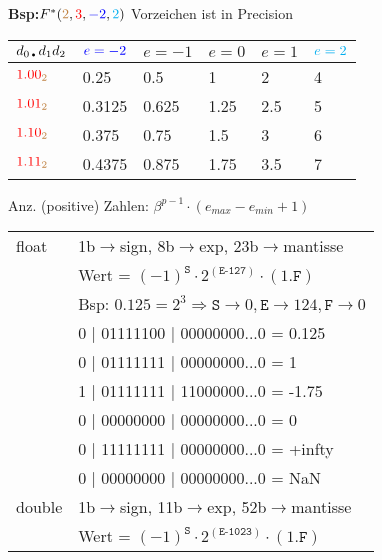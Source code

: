 \textbf{Bsp:$F^{\ast}({\color{brown}{2}},{\color{red}{3}},{\color{blue}{-2}},{\color{cyan}{2}})$} Vorzeichen ist in Precision
\begin{center}
	\begin{tabular} { m{0.8cm} | m{0.8cm} m{0.95cm} m{0.7cm} m{0.7cm}m{0.6cm} }
	 $d_{0\text{\textbullet}} d_1 d_2$ & ${\color{blue}{e=-2}}$&$e=-1$&$e=0$&$e=1$&${\color{cyan}{e=2}}$\\
	 \hline
	 ${\color{red}{1.00}}{\color{brown}{_2}}$ & 0.25   & 0.5   & 1    & 2   & 4\\
	 ${\color{red}{1.01}}{\color{brown}{_2}}$ & 0.3125 & 0.625 & 1.25 & 2.5 & 5\\
	 ${\color{red}{1.10}}{\color{brown}{_2}}$ & 0.375  & 0.75  & 1.5  & 3   & 6\\
	 ${\color{red}{1.11}}{\color{brown}{_2}}$ & 0.4375 & 0.875 & 1.75 & 3.5 & 7\\
	 \hline
	\end{tabular}
\end{center}
Anz. (positive) Zahlen: $\beta^{p-1}\cdot (e_{max}-e_{min}+1) $
\begin{center}
	\begin{tabular}{ ll } 
		float&1b$\rightarrow$sign, 8b$\rightarrow$exp, 23b$\rightarrow$mantisse\\
		&Wert = $(-1)^{\texttt{S}} \cdot 2^{(\texttt{E-127})} \cdot (1.\texttt{F})$\\
		&Bsp: $0.125 = 2^{3} \Rightarrow \texttt{S} \rightarrow 0, \texttt{E} \rightarrow 124, \texttt{F} \rightarrow 0$\\
		\hline
		 & 0 | 01111100 | 00000000...0 = 0.125\\
		 & 0 | 01111111 | 00000000...0 = 1\\
		 & 1 | 01111111 | 11000000...0 = -1.75\\
		 & 0 | 00000000 | 00000000...0 = 0\\
		 & 0 | 11111111 | 00000000...0 = +infty\\
		 & 0 | 00000000 | 00000000...0 = NaN\\
		\hline
		double& 1b$\rightarrow$sign, 11b$\rightarrow$exp, 52b$\rightarrow$mantisse\\
		& Wert = $(-1)^{\texttt{S}} \cdot 2^{(\texttt{E-1023})} \cdot (1.\texttt{F})$\\
	\end{tabular}
\end{center}















